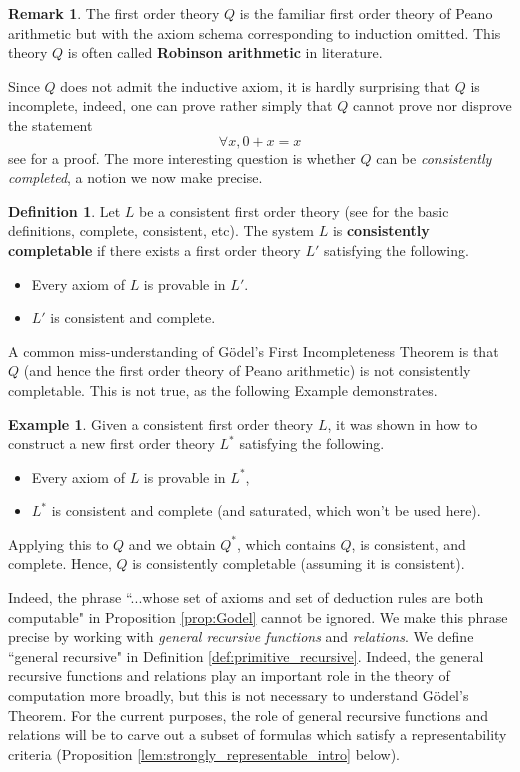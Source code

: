 \documentclass[12pt]{article}
\theoremstyle{plain}
\theoremstyle{definition}
\newtheorem{defn}[thm]{Definition} %
\newtheorem{remark}[thm]{Remark}
\newtheorem{example}[thm]{Example}
\begin{document}
	\begin{remark}
		The first order theory $Q$ is the familiar first order theory of Peano arithmetic but with the axiom schema corresponding to induction omitted. This theory $Q$ is often called \textbf{Robinson arithmetic} in literature.
	\end{remark}
	Since $Q$ does not admit the inductive axiom, it is hardly surprising that $Q$ is incomplete, indeed, one can prove rather simply that $Q$ cannot prove nor disprove the statement
	\begin{equation}
		\forall x, 0 + x = x
	\end{equation}
	see \cite[\S 8.4]{smith} for a proof. The more interesting question is whether $Q$ can be \emph{consistently completed}, a notion we now make precise.
	\begin{defn}
		Let $L$ be a consistent first order theory (see \cite{Billy} for the basic definitions, complete, consistent, etc). The system $L$ is \textbf{consistently completable} if there exists a first order theory $L'$ satisfying the following.
		\begin{itemize}
			\item Every axiom of $L$ is provable in $L'$.
			\item $L'$ is consistent and complete.
		\end{itemize}
	\end{defn}
	A common miss-understanding of G\"{o}del's First Incompleteness Theorem is that $Q$ (and hence the first order theory of Peano arithmetic) is not consistently completable. This is not true, as the following Example demonstrates.
	\begin{example}\label{ex:is_doable}
		Given a consistent first order theory $L$, it was shown in \cite[Theorem 1]{Billy} how to construct a new first order theory $L^\ast$ satisfying the following.
		\begin{itemize}
			\item Every axiom of $L$ is provable in $L^\ast$,
			\item $L^\ast$ is consistent and complete (and saturated, which won't be used here).
		\end{itemize}
		Applying this to $Q$ and we obtain $Q^\ast$, which contains $Q$, is consistent, and complete. Hence, $Q$ is consistently completable (assuming it is consistent).
	\end{example}
	Indeed, the phrase ``...whose set of axioms and set of deduction rules are both computable" in Proposition \ref{prop:Godel} cannot be ignored. We make this phrase precise by working with \emph{general recursive functions} and \emph{relations}. We define ``general recursive" in Definition \ref{def:primitive_recursive}. Indeed, the general recursive functions and relations play an important role in the theory of computation more broadly, but this is not necessary to understand G\"{o}del's Theorem. For the current purposes, the role of general recursive functions and relations will be to carve out a subset of formulas which satisfy a representability criteria (Proposition \ref{lem:strongly_representable_intro} below).
	
\end{document}
